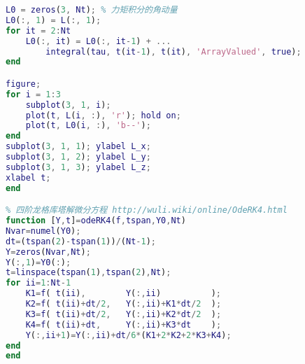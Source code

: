 \begin{lstlisting}[language=matlab, caption=rigBdRot.m]
L0 = zeros(3, Nt); % 力矩积分的角动量
L0(:, 1) = L(:, 1);
for it = 2:Nt
    L0(:, it) = L0(:, it-1) + ...
        integral(tau, t(it-1), t(it), 'ArrayValued', true);
end

figure;
for i = 1:3
    subplot(3, 1, i);
    plot(t, L(i, :), 'r'); hold on;
    plot(t, L0(i, :), 'b--');
end
subplot(3, 1, 1); ylabel L_x;
subplot(3, 1, 2); ylabel L_y;
subplot(3, 1, 3); ylabel L_z;
xlabel t;
end

% 四阶龙格库塔解微分方程 http://wuli.wiki/online/OdeRK4.html
function [Y,t]=odeRK4(f,tspan,Y0,Nt)
Nvar=numel(Y0);
dt=(tspan(2)-tspan(1))/(Nt-1);
Y=zeros(Nvar,Nt);
Y(:,1)=Y0(:);
t=linspace(tspan(1),tspan(2),Nt);
for ii=1:Nt-1
    K1=f( t(ii),        Y(:,ii)          );
    K2=f( t(ii)+dt/2,   Y(:,ii)+K1*dt/2  );
    K3=f( t(ii)+dt/2,   Y(:,ii)+K2*dt/2  );
    K4=f( t(ii)+dt,     Y(:,ii)+K3*dt    );
    Y(:,ii+1)=Y(:,ii)+dt/6*(K1+2*K2+2*K3+K4);
end
end
\end{lstlisting}

